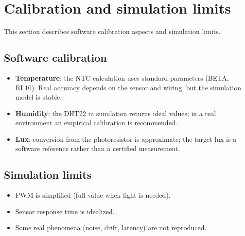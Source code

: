 \chapter{Calibration and simulation limits}

This section describes software calibration aspects and simulation limits.

\section{Software calibration}
\begin{itemize}
  \item \textbf{Temperature}: the NTC calculation uses standard parameters (BETA, RL10). Real accuracy depends on the sensor and wiring, but the simulation model is stable.
  \item \textbf{Humidity}: the DHT22 in simulation returns ideal values; in a real environment an empirical calibration is recommended.
  \item \textbf{Lux}: conversion from the photoresistor is approximate; the target lux is a software reference rather than a certified measurement.
\end{itemize}

\section{Simulation limits}
\begin{itemize}
  \item PWM is simplified (full value when light is needed).
  \item Sensor response time is idealized.
  \item Some real phenomena (noise, drift, latency) are not reproduced.
\end{itemize}
